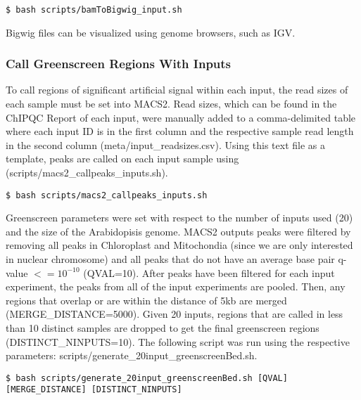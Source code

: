 \documentclass{article}
\begin{document}
\begin{sloppypar}
\begin{verbatim}
$ bash scripts/bamToBigwig_input.sh
\end{verbatim}

Bigwig files can be visualized using genome browsers, such as IGV.

\subsubsection{Call Greenscreen Regions With Inputs}

To call regions of significant artificial signal within each input, the read sizes of each sample must be set into MACS2. Read sizes, which can be found in the ChIPQC Report of each input, were manually added to a comma-delimited table where each input ID is in the first column and the respective sample read length in the second column ({\selectfont meta/input\_readsizes.csv}). Using this text file as a template, peaks are called on each input sample using ({\selectfont scripts/macs2\_callpeaks\_inputs.sh}). 

\begin{verbatim}
$ bash scripts/macs2_callpeaks_inputs.sh
\end{verbatim}

Greenscreen parameters were set with respect to the number of inputs used (20) and the size of the Arabidopisis genome. MACS2 outputs peaks were filtered by removing all peaks in Chloroplast and Mitochondia (since we are only interested in nuclear chromosome) and all peaks that do not have an average base pair q-value $<=10^{-10}$ (QVAL=10). After peaks have been filtered for each input experiment, the peaks from all of the input experiments are pooled. Then, any regions that overlap or are within the distance of 5kb are merged (MERGE_DISTANCE=5000).  Given 20 inputs, regions that are called in less than 10 distinct samples are dropped to get the final greenscreen regions (DISTINCT_NINPUTS=10). The following script was run using the respective parameters: {\selectfont scripts/generate\_20input\_greenscreenBed.sh}.

\begin{verbatim}
$ bash scripts/generate_20input_greenscreenBed.sh [QVAL] [MERGE_DISTANCE] [DISTINCT_NINPUTS]
\end{verbatim}



\end{sloppypar}
\end{document}
